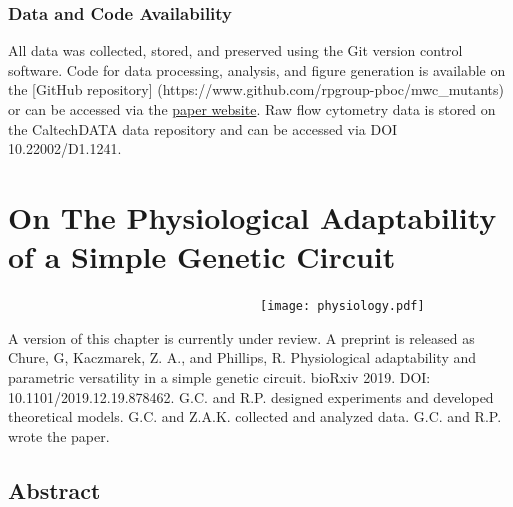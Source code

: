 \documentclass[12pt]{caltech_thesis}
\begin{document}
\hypertarget{data-and-code-availability}{%
\subsection{Data and Code
Availability}\label{data-and-code-availability}}

All data was collected, stored, and preserved using the Git version
control software. Code for data processing, analysis, and figure
generation is available on the {[}GitHub repository{]}
(https://www.github.com/rpgroup-pboc/mwc\_mutants) or can be accessed
via the \href{http://www.rpgroup.caltech.edu/mwc_mutants}{paper
website}. Raw flow cytometry data is stored on the CaltechDATA data
repository and can be accessed via DOI 10.22002/D1.1241.

\hypertarget{on-the-physiological-adaptability-of-a-simple-genetic-circuit}{%
\chapter{On The Physiological Adaptability of a Simple Genetic
Circuit}\label{on-the-physiological-adaptability-of-a-simple-genetic-circuit}}

~~~~~~~~~~~~~~~~~~~~~~~~~~~~~~~~~~~~\texttt{[image: physiology.pdf]}

A version of this chapter is currently under review. A preprint is
released as Chure, G, Kaczmarek, Z. A., and Phillips, R. Physiological
adaptability and parametric versatility in a simple genetic circuit.
bioRxiv 2019. DOI: 10.1101/2019.12.19.878462. G.C. and R.P. designed
experiments and developed theoretical models. G.C. and Z.A.K. collected
and analyzed data. G.C. and R.P. wrote the paper.

\hypertarget{abstract-2}{%
\section{Abstract}\label{abstract-2}}
\end{document}
